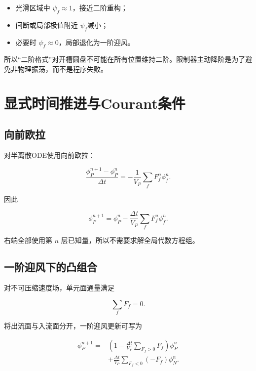 \documentclass[UTF8,12pt,a4paper,fontset=fandol]{ctexart}
\numberwithin{equation}{section}
\begin{document}
\begin{itemize}
  \item 光滑区域中 $\psi_f\approx1$，接近二阶重构；
  \item 间断或局部极值附近 $\psi_f$减小；
  \item 必要时 $\psi_f\approx0$，局部退化为一阶迎风。
\end{itemize}

所以“二阶格式”对开槽圆盘不可能在所有位置维持二阶。限制器主动降阶是为了避免非物理振荡，而不是程序失败。

\section{显式时间推进与Courant条件}

\subsection{向前欧拉}

对半离散ODE使用向前欧拉：

\begin{equation}
  \frac{\phi_P^{n+1}-\phi_P^n}{\Delta t}
  =
  -\frac1{V_P}
  \sum_fF_f^n\phi_f^n.
\end{equation}

因此

\begin{equation}
  \boxed{
  \phi_P^{n+1}
  =
  \phi_P^n
  -
  \frac{\Delta t}{V_P}
  \sum_fF_f^n\phi_f^n
  }.
  \label{eq:forward_euler}
\end{equation}

右端全部使用第 $n$ 层已知量，所以不需要求解全局代数方程组。

\subsection{一阶迎风下的凸组合}

对不可压缩速度场，单元面通量满足

\begin{equation}
  \sum_fF_f=0.
\end{equation}

将出流面与入流面分开，一阶迎风更新可写为

\begin{equation}
\begin{aligned}
  \phi_P^{n+1}
  =&
  \left(
  1-\frac{\Delta t}{V_P}
  \sum_{F_f>0}F_f
  \right)\phi_P^n\\
  &+
  \frac{\Delta t}{V_P}
  \sum_{F_f<0}(-F_f)\phi_N^n.
\end{aligned}
\label{eq:convex_update}
\end{equation}
\end{document}
